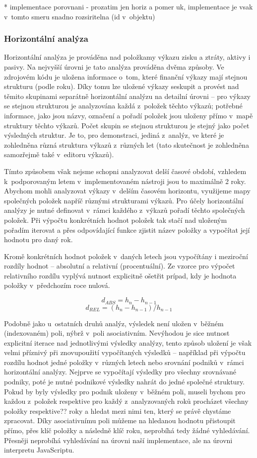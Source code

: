 * implementace porovnani - prozatim jen horiz a pomer uk, implementace je vsak v~tomto smeru snadno rozsiritelna (id v~objektu)

\subsubsection{Horizontální analýza}
Horizontální analýza je prováděna nad položkamy výkazu zisku a ztráty, aktivy i pasivy. Na nejvyšší úrovni je tato analýza prováděna dvěma způsoby. Ve zdrojovém kódu je uložena informace o~tom, které finanční výkazy mají stejnou strukturu (podle roku). Díky tomu lze uložené výkazy seskupit a provést nad těmito skupinami separátně horizontální analýzu na detailní úrovni -- pro výkazy se stejnou strukturou je analyzována každá z~položek těchto výkazů; potřebné informace, jako jsou názvy, označení a pořadí položek jsou uloženy přímo v~mapě struktury těchto výkazů. Počet skupin se stejnou strukturou je stejný jako počet výsledných struktur. Je to, pro demonstraci, jediná z~analýz, ve které je zohledněna různá struktura výkazů z~různých let (tato skutečnost je zohledněna samozřejmě také v~editoru výkazů).

Tímto způsobem však nejsme schopni analyzovat delší časové období, vzhledem k~podporovaným letem v~implementovaném nástroji jsou to maximálně 2 roky. Abychom mohli analyzovat výkazy v~delším časovém horizontu, využijeme mapy společných položek napříč různými strukturami výkazů. Pro účely horizontální analýzy je nutné definovat v~rámci každého z~výkazů pořadí těchto společných položek. Při výpočtu konkrétních hodnot položek tak stačí nad uloženým pořadím iterovat a přes odpovídající funkce zjistit název položky a vypočítat její hodnotu pro daný rok.

Kromě konkrétních hodnot položek v~daných letech jsou vypočítány i meziroční rozdíly hodnot -- absolutní a relativní (procentuální). Ze vzorce pro výpočet relativního rozdílu vyplývá nutnost explicitně ošetřit prípad, kdy je hodnota položky v~předchozím roce nulová.

$$d_{ABS}=h_{n}-h_{n-1}$$
$$d_{REL}=(h_{n}-h_{n-1})/h_{n-1}$$


Podobně jako u~ostatních druhů analýz, výsledek není uložen v~běžném (indexovaném) poli, nýbrž v~poli asociativním. Nevýhodou je sice nutnost explicitní iterace nad jednotlivými výsledky analýzy, tento způsob uložení je však velmi příznivý při znovupoužití vypočítaných výsledků -- například při výpočtu rozdílu hodnot jedné položky v~různých letech nebo srovnání podniků v~rámci horizontální analýzy. Nejprve se vypočítají výsledky pro všechny srovnávané podniky, poté je nutné podnikové výsledky nahrát do jedné společné struktury. Pokud by byly výsledky pro podnik uloženy v~běžném poli, museli bychom pro každou z~položek respektive pro každý z~analyzovaných roků procházet všechny položky respektive?? roky a hledat mezi nimi ten, který se právě chystáme zpracovat. Díky asociativnímu poli můžeme na hledanou hodnotu přistoupit přímo, přes klíč položky a následně klíč roku, neprobíhá tedy žádné vyhledávání. Přesněji neprobíhá vyhledávání na úrovni naší implementace, ale na úrovni interpretu JavaScriptu.

